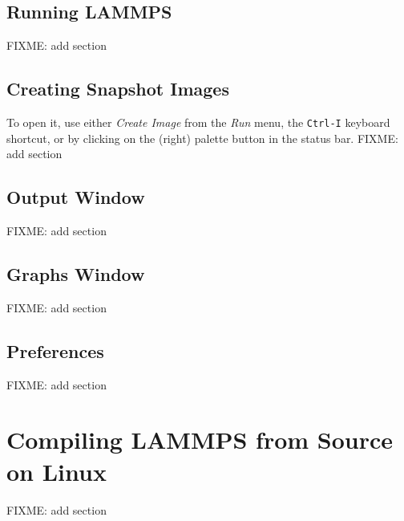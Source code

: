 \documentclass[9pt,tutorial]{livecoms}
\begin{document}
\begin{appendices}

\subsection{Running LAMMPS}

FIXME: add section

\subsection{Creating Snapshot Images}

  To open it, use
either \textit{Create Image} from the \textit{Run} menu, the
\texttt{Ctrl-I} keyboard shortcut, or by clicking on the (right) palette
button in the status bar. FIXME: add section

\subsection{Output Window}

FIXME: add section

\subsection{Graphs Window}

FIXME: add section

\subsection{Preferences}

FIXME: add section

\section{Compiling LAMMPS from Source on Linux}
  \label{compiling-lammps-label}
  FIXME: add section


\end{appendices}
\end{document}
